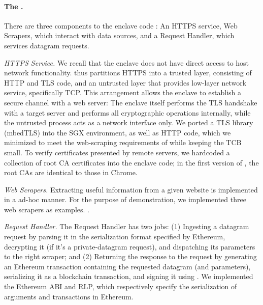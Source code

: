 \paragraph{\bf The \encname.} There are three components to the enclave code \engine: An HTTPS service, Web Scrapers, which interact with data sources, and a Request Handler, which services datagram requests. 

\vspace{2mm}

\noindent\emph{HTTPS Service.} We recall that the enclave does not have direct access to host network functionality. \tc thus partitions HTTPS into a trusted layer, consisting of HTTP and TLS code, and an untrusted layer that provides low-layer network service, specifically TCP.  This arrangement allows the enclave to establish a secure channel with a web server: The enclave itself performs the TLS handshake with a target server and performs all cryptographic operations internally, while the untrusted process acts as a network interface only. We ported a TLS library (mbedTLS) into the SGX environment, as well as HTTP code, which we minimized to meet the web-scraping requirements of \tc while keeping the TCB small. To verify certificates presented by remote servers, we hardcoded a collection of root CA certificates into the enclave code; in the first version of \tc, the root CAs are identical to those in Chrome.

\vspace{2mm}

\noindent\emph{Web Scrapers.} Extracting useful information from a given website is
implemented in a ad-hoc manner. For the purpose of demonstration, we implemented
three web scrapers as examples. .

\vspace{2mm}

\noindent\emph{Request Handler.} The Request Handler has two jobs: (1) Ingesting a datagram request by parsing 
it in the serialization format specified by Ethereum, decrypting it (if it's a private-datagram request), and dispatching its parameters to the right scraper; and (2) Returning the response to the request by generating an Ethereum
transaction containing the requested datagram (and parameters), serializing it as a blockchain transaction, and signing it using \skTC. We implemented the Ethereum ABI and RLP, which respectively
specify the serialization of arguments and transactions in Ethereum. 

